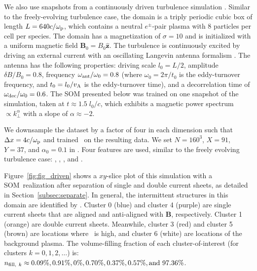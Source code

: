 We also use snapshots from a continuously driven turbulence simulation \citep{nattila_radiative_2024}.
Similar to the freely-evolving turbulence case, the domain is a triply periodic cubic box of length $L = 640 c/\omega_{\rm p}$, which contains a neutral $e^\pm$-pair plasma with 8 particles per cell per species.
The domain has a magnetization of $\sigma = 10$ and is initialized with a uniform magnetic field $\mathbf{B}_0 = B_0 \hat{\mathbf{z}}$.
The turbulence is continuously excited by driving an external current with an oscillating Langevin antenna formalism \citep{tenbarge_oscillating_2014}.
The antenna has the following properties: driving scale $l_0 = L/2$, amplitude $\delta B / B_0 = 0.8$, frequency $\omega_{\rm ant}/\omega_{0} = 0.8$ (where $\omega_0 = 2\pi/t_0$ is the eddy-turnover frequency, and $t_0 = l_0/v_{\rm A}$ is the eddy-turnover time), and a decorrelation time of $\omega_{\rm dec} / \omega_0 = 0.6$.
The SOM presented below was trained on one snapshot of the simulation, taken at $t \approx 1.5\;l_0/c$, which exhibits a magnetic power spectrum  $\propto k_\perp^\alpha$ with a slope of $\alpha \approx -2$.

We downsample the dataset by a factor of four in each dimension such that $\Delta x = 4 c/\omega_{\rm p}$ and trained \awesom\ on the resulting data.
We set $N = 160^3$, $X = 91$, $Y = 37$, and $\alpha_0 = 0.1$ in \awesom\@.
Four features are used, similar to the freely evolving turbulence case: \jpar, \jasym, \bperp, and \epar.

Figure~\ref{fig:fig_driven} shows a $xy$-slice plot of this simulation with a SOM~realization after separation of single and double current sheets, as detailed in Section~\ref{subsec:separate}.
In general, the intermittent structures in this domain are identified by \awesom\@.
Cluster 0 (blue) and cluster 4 (purple) are single current sheets that are aligned and anti-aligned with $\mathbf{B}$, respectively.
Cluster 1 (orange) are double current sheets.
Meanwhile, cluster 3 (red) and cluster 5 (brown) are locations where \epar\ is high, and cluster 6 (white) are locations of the background plasma.
The volume-filling fraction of each cluster-of-interest (for clusters $k = 0, 1, 2, \ldots$) is: $n_{{\rm fill},\ k} \approx 0.09\%, 0.91\%, 0\%, 0.70\%, 0.37\%, 0.57\%, {\rm and}\ 97.36\%$.


